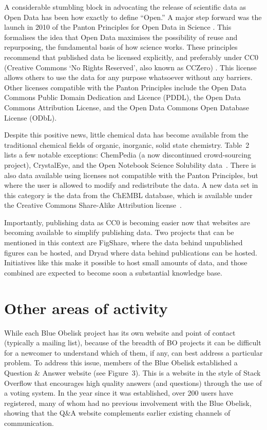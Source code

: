 \documentclass[10pt]{bmc_article}
\newenvironment{bmcformat}{\fussy\setboolean{publ}{true}}{\fussy}
\begin{document}
\begin{bmcformat}
A considerable stumbling block in advocating the release of scientific
data as Open Data has been how exactly to define ``Open.'' A major step
forward was the launch in 2010 of the Panton Principles for Open Data
in Science \cite{WebPanton}. This formalises the idea that Open Data maximises the
possibility of reuse and repurposing, the fundamental basis
of how science works. These principles recommend that published data
be licensed explicitly, and preferably under CC0 (Creative Commons `No
Rights Reserved', also known as CCZero) \cite{WebCC0}. This license allows others to use the
data for any purpose whatsoever without any barriers. Other licenses
compatible with the Panton Principles include the
Open Data Commons Public Domain Dedication and Licence (PDDL), the
Open Data Commons Attribution License, and the
Open Data Commons Open Database License (ODbL).\cite{WebOpenData}

Despite this positive news, little chemical data has become
available from the traditional chemical fields of organic,
inorganic, solid state chemistry. Table~2 lists a few notable
exceptions: ChemPedia (a now discontinued crowd-sourcing project),
CrystalEye,\cite{WebCrystalEye}
and the Open Notebook Science Solubility
data~\cite{ONS2010}. There is also data available using licenses
not compatible with the Panton Principles, but where the user
is allowed to modify and redistribute the data. A new data
set in this category is the data from the ChEMBL database,
which is available under the Creative Commons Share-Alike
Attribution license~\cite{Overington2009}.

Importantly, publishing data as CC0 is becoming easier now that
websites are becoming available to simplify publishing data. Two
projects that can be mentioned in this context are
FigShare\cite{WebFigShare}, where the data behind unpublished figures
can be hosted, and Dryad\cite{WebDryad} where data behind publications
can be hosted. Initiatives like this make it possible to host small
amounts of data, and those combined are expected to become soon a
substantial knowledge base. 

\section*{Other areas of activity}

While each Blue Obelisk project has its own website and point of
contact (typically a mailing list), because of the breadth of BO
projects it can be difficult for a newcomer to understand which of
them, if any, can best address a particular problem. To address this
issue, members of the Blue Obelisk established a Question \& Answer
website\cite{WebBOShapado} (see Figure~3).  This is a website in the
style of Stack Overflow\cite{WebStackOverflow} that encourages high quality answers (and
questions) through the use of a voting system. In the year since it
was established, over 200 users have registered, many of whom had no
previous involvement with the Blue Obelisk, showing that the Q\&A
website complements earlier existing channels of communication.


\end{bmcformat}
\end{document}

